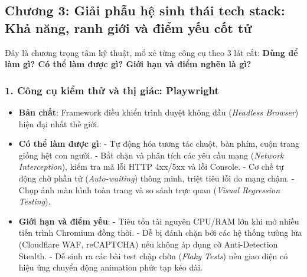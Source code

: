 \documentclass[a4paper,11pt]{article}
\begin{document}
\subsection{Chương 3: Giải phẫu hệ sinh thái tech stack: Khả năng, ranh giới và điểm yếu cốt tử}

Đây là chương trọng tâm kỹ thuật, mổ xẻ từng công cụ theo 3 lát cắt: \textbf{Dùng để làm gì? Có thể làm được gì? Giới hạn và điểm nghẽn là gì?}

\subsubsection{1. Công cụ kiểm thử và thị giác: Playwright}
\begin{itemize}[leftmargin=1.5em]
    \item \textbf{Bản chất}: Framework điều khiển trình duyệt không đầu (\textit{Headless Browser}) hiện đại nhất thế giới.
    \item \textbf{Có thể làm được gì}:
        - Tự động hóa tương tác chuột, bàn phím, cuộn trang giống hệt con người.
        - Bắt chặn và phân tích các yêu cầu mạng (\textit{Network Interception}), kiểm tra mã lỗi HTTP 4xx/5xx và lỗi Console.
        - Cơ chế tự động chờ phần tử (\textit{Auto-waiting}) thông minh, triệt tiêu lỗi do mạng chậm.
        - Chụp ảnh màn hình toàn trang và so sánh trực quan (\textit{Visual Regression Testing}).
    \item \textbf{Giới hạn và điểm yếu}:
        - Tiêu tốn tài nguyên CPU/RAM lớn khi mở nhiều tiến trình Chromium đồng thời.
        - Dễ bị đánh chặn bởi các hệ thống tường lửa (Cloudflare WAF, reCAPTCHA) nếu không áp dụng cờ Anti-Detection Stealth.
        - Dễ sinh ra các bài test chập chờn (\textit{Flaky Tests}) nếu giao diện có hiệu ứng chuyển động animation phức tạp kéo dài.
\end{itemize}
\end{document}
